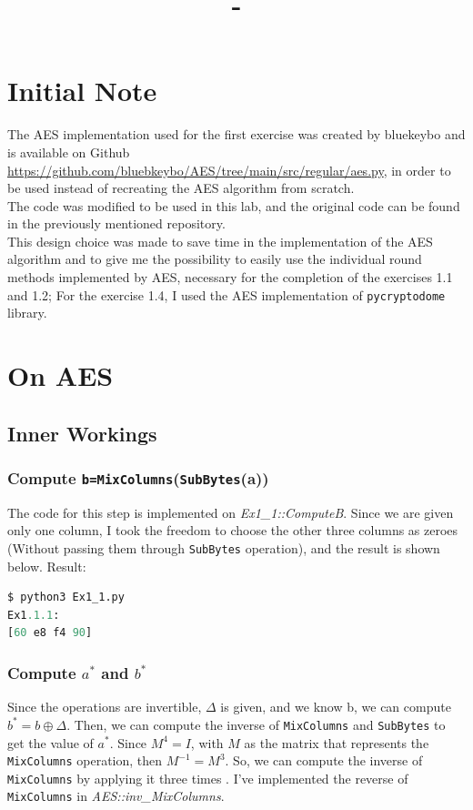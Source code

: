 \documentclass{article}
\date{}
\title{\textit{\course} - \labName}
\author{\me}
\begin{document}
\maketitle

\section*{Initial Note}
The AES implementation used for the first exercise was created by bluekeybo and is available on Github \url{https://github.com/bluebkeybo/AES/tree/main/src/regular/aes.py}, in order to be used instead of recreating the AES algorithm from scratch.\\
The code was modified to be used in this lab, and the original code can be found in the previously mentioned repository.\\
This design choice was made to save time in the implementation of the AES algorithm and to give me the possibility to easily use the individual round methods implemented by AES, necessary for the completion of the exercises 1.1 and 1.2; For the exercise 1.4, I used the AES implementation of \texttt{pycryptodome} library.

\section{On AES}
\subsection{Inner Workings}
\subsubsection{Compute \texttt{b=}\texttt{MixColumns}(\texttt{SubBytes}(a))}
The code for this step is implemented on \textit{Ex1\_1::ComputeB}. Since we are given only one column, I took the freedom to choose the other three columns as zeroes (Without passing them through \texttt{SubBytes} operation), and the result is shown below.
Result:
\begin{lstlisting}[language=python]
$ python3 Ex1_1.py
Ex1.1.1:
[60 e8 f4 90]
\end{lstlisting}


\subsubsection{Compute $a^*$ and $b^*$}
Since the operations are invertible, $\Delta$ is given, and we know b, we can compute $b^{*} = b \oplus \Delta$.
Then, we can compute the inverse of \texttt{MixColumns} and \texttt{SubBytes} to get the value of $a^{*}$.
Since $M^4 = I$, with $M$ as the matrix that represents the \texttt{MixColumns} operation, then $M^{-1} = M^3$. So, we can compute the inverse of \texttt{MixColumns} by applying it three times \cite{InvMixColumns}. I've implemented the reverse of \texttt{MixColumns} in \textit{AES::inv\_MixColumns}.
\end{document}
